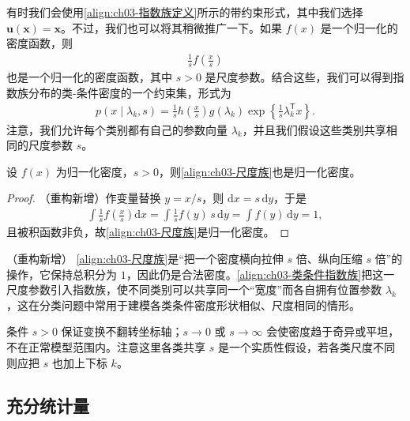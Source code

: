 \documentclass[../../main.tex]{subfiles}
\begin{document}
有时我们会使用\eqref{align:ch03-指数族定义}所示的带约束形式，其中我们选择 $\boldsymbol{u}(\boldsymbol{x})=\boldsymbol{x}$。不过，我们也可以将其稍微推广一下。如果 $f(x)$ 是一个归一化的密度函数，则
\begin{align}
\frac{1}{s}f\left(\frac{x}{s}\right)
\label{align:ch03-尺度族}
\end{align}
也是一个归一化的密度函数，其中 $s>0$ 是尺度参数。结合这些，我们可以得到指数族分布的类-条件密度的一个约束集，形式为
\begin{align}
p(x\mid\lambda_k,s)=\frac{1}{s}h\left(\frac{x}{s}\right)g(\lambda_k)\exp\left\{\frac{1}{s}\lambda_k^{\mathsf{T}}x\right\}.
\label{align:ch03-类条件指数族}
\end{align}
注意，我们允许每个类别都有自己的参数向量 $\lambda_k$，并且我们假设这些类别共享相同的尺度参数 $s$。

\begin{proposition}[尺度变换保持归一化]\label{proposition:ch03-尺度变换}
设 $f(x)$ 为归一化密度，$s>0$，则\eqref{align:ch03-尺度族}也是归一化密度。
\end{proposition}
\begin{proof}
（重构新增）作变量替换 $y=x/s$，则 $\mathrm{d}x=s\,\mathrm{d}y$，于是
\begin{align*}
\int\frac{1}{s}f\left(\frac{x}{s}\right)\mathrm{d}x=\int\frac{1}{s}f(y)\,s\,\mathrm{d}y=\int f(y)\,\mathrm{d}y=1,
\end{align*}
且被积函数非负，故\eqref{align:ch03-尺度族}是归一化密度。
\end{proof}

\begin{remark}（重构新增）
\eqref{align:ch03-尺度族}是“把一个密度横向拉伸 $s$ 倍、纵向压缩 $s$ 倍”的操作，它保持总积分为 $1$，因此仍是合法密度。\eqref{align:ch03-类条件指数族}把这一尺度参数引入指数族，使不同类别可以共享同一个“宽度”而各自拥有位置参数 $\lambda_k$，这在分类问题中常用于建模各类条件密度形状相似、尺度相同的情形。

条件 $s>0$ 保证变换不翻转坐标轴；$s\to0$ 或 $s\to\infty$ 会使密度趋于奇异或平坦，不在正常模型范围内。注意这里各类共享 $s$ 是一个实质性假设，若各类尺度不同则应把 $s$ 也加上下标 $k$。
\end{remark}

\subsection{充分统计量}\label{subsection:ch03-充分统计量}
\end{document}
